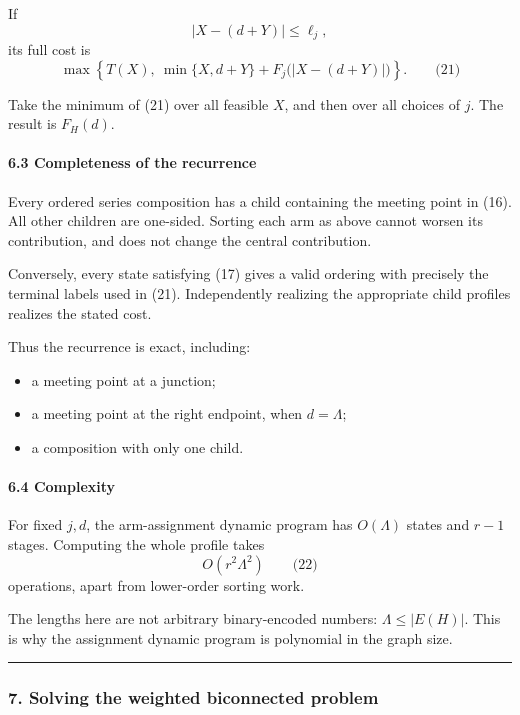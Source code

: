 \documentclass[
  11pt,
  a4paper,
]{article}
\providecommand{\tightlist}{%
  \setlength{\itemsep}{0pt}\setlength{\parskip}{0pt}}
\begin{document}
If \[
|X-(d+Y)|\le \ell_j,
\] its full cost is \[
\max\left\{
T(X),\
\min\{X,d+Y\}
+
F_j\bigl(|X-(d+Y)|\bigr)
\right\}.
\qquad\text{(21)}
\]

Take the minimum of (21) over all feasible \(X\), and then over all
choices of \(j\). The result is \(F_H(d)\).

\paragraph{6.3 Completeness of the
recurrence}\label{completeness-of-the-recurrence}

Every ordered series composition has a child containing the meeting
point in (16). All other children are one-sided. Sorting each arm as
above cannot worsen its contribution, and does not change the central
contribution.

Conversely, every state satisfying (17) gives a valid ordering with
precisely the terminal labels used in (21). Independently realizing the
appropriate child profiles realizes the stated cost.

Thus the recurrence is exact, including:

\begin{itemize}
\tightlist
\item
  a meeting point at a junction;
\item
  a meeting point at the right endpoint, when \(d=\Lambda\);
\item
  a composition with only one child.
\end{itemize}

\paragraph{6.4 Complexity}\label{complexity}

For fixed \(j,d\), the arm-assignment dynamic program has \(O(\Lambda)\)
states and \(r-1\) stages. Computing the whole profile takes \[
O(r^2\Lambda^2)
\qquad\text{(22)}
\] operations, apart from lower-order sorting work.

The lengths here are not arbitrary binary-encoded numbers:
\(\Lambda\le |E(H)|\). This is why the assignment dynamic program is
polynomial in the graph size.

\begin{center}\rule{0.5\linewidth}{0.5pt}\end{center}

\subsubsection{7. Solving the weighted biconnected
problem}\label{solving-the-weighted-biconnected-problem}
\end{document}
